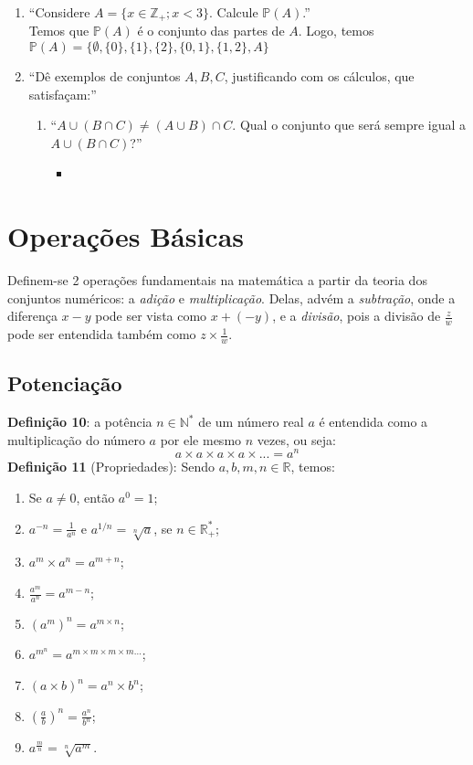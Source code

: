 \documentclass[13pt,letterpaper]{article}
\begin{document}
\begin{enumerate}
\begin{enumerate}
\begin{itemize}
        \end{itemize}
    \end{enumerate}
    \item \enquote{Considere $A = \{ x \in \mathbb{Z}_+ ; x < 3 \}$. Calcule $\mathbb{P}(A)$.} \\
    Temos que $\mathbb{P}(A)$ é o conjunto das partes de $A$. Logo, temos $\mathbb{P}(A) = \{\emptyset, \{0\}, \{1\}, \{2\}, \{0, 1\}, \{1, 2\}, A \}$
    \item \enquote{Dê exemplos de conjuntos $A, B, C$, justificando com os cálculos, que satisfaçam:}
    \begin{enumerate}
        \item \enquote{$A \cup (B \cap C) \ne (A \cup B) \cap C$. Qual o conjunto que será sempre igual a $A \cup (B \cap C)$?}
        \begin{itemize}
            \item 
        \end{itemize}
    \end{enumerate}
\end{enumerate}

\section{Operações Básicas}
Definem-se 2 operações fundamentais na matemática a partir da teoria dos conjuntos numéricos: a \emph{adição} e \emph{multiplicação}. Delas, advém a \emph{subtração}, onde a diferença $x - y$ pode ser vista como $x + (-y)$, e a \emph{divisão}, pois a divisão de $\frac{z}{w}$ pode ser entendida também como $z \times \frac{1}{w}$.
\subsection{Potenciação}
\textbf{Definição 10}: a potência $n \in \mathbb{N}^*$ de um número real $a$ é entendida como a multiplicação do número $a$ por ele mesmo $n$ vezes, ou seja:
\begin{displaymath}
    a \times a \times a \times a \times ... = a^n
\end{displaymath}
\textbf{Definição 11} (Propriedades): Sendo $a, b, m, n \in \mathbb{R}$, temos:
\begin{enumerate}
    \item Se $a \ne 0$, então $a^0 = 1$;
    \item $a^{-n} = \frac{1}{a^n}$ e $a^{1/n} = \sqrt[n]{a}$, se $n \in \mathbb{R}^*_+$;
    \item $a^m \times a^n = a^{m+n}$;
    \item $\frac{a^m}{a^n} = a^{m-n}$;
    \item $(a^m)^n = a^{m \times n}$;
    \item $a^{m^n} = a^{m \times m \times m \times m ...}$;
    \item $(a \times b)^n = a^n \times b^n$;
    \item $(\frac{a}{b})^n = \frac{a^n}{b^n}$;
    \item $a^{\frac{m}{n}} = \sqrt[n]{a^m}$.
\end{enumerate}
\end{document}
